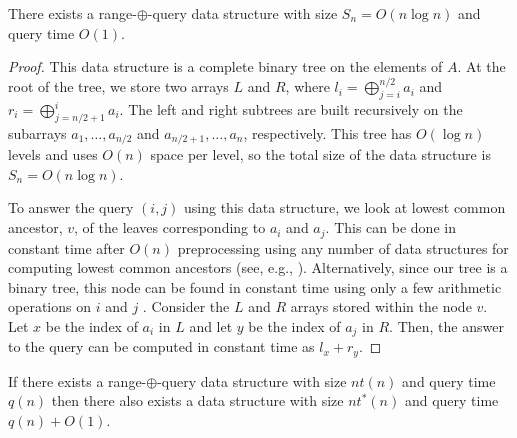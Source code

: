 \documentclass[lotsofwhite]{patmorin}
\begin{document}
\begin{lem}
There exists a range-$\oplus$-query data structure with size $S_n=O(n\log n)$
and query time $O(1)$.
\end{lem}

\begin{proof}
This data structure is a complete binary tree on the elements of $A$.
At the root of the tree, we store two arrays $L$ and $R$, where $l_i =
\bigoplus_{j=i}^{n/2} a_i$ and $r_i = \bigoplus_{j=n/2+1}^i a_i$.  The
left and right subtrees are built recursively on the subarrays
$a_1,\ldots,a_{n/2}$ and $a_{n/2+1},\ldots,a_n$, respectively.  This tree
has $O(\log n)$ levels and uses $O(n)$ space per level, so the total
size of the data structure is $S_n=O(n\log n)$.

To answer the query $(i,j)$ using this data structure, we look at
lowest common ancestor, $v$, of the leaves corresponding to $a_i$ and
$a_j$.  This can be done in constant time after $O(n)$ preprocessing
using any number of data structures for computing lowest common
ancestors (see, e.g., \cite{X}). Alternatively, since our tree is a
binary tree, this node can be found in constant time using only a few
arithmetic operations on $i$ and $j$ \cite{X}.  Consider the $L$ and
$R$ arrays stored within the node $v$.  Let $x$ be the index of $a_i$
in $L$ and let $y$ be the index of $a_j$ in $R$.  Then, the answer to
the query can be computed in constant time as $l_x+r_y$.
\end{proof}


\begin{lem}
If there exists a range-$\oplus$-query data structure with size
$nt(n)$ and query time $q(n)$ then there also exists a data structure
with size $nt^*(n)$ and query time $q(n)+O(1)$.
\end{lem}
\end{document}
